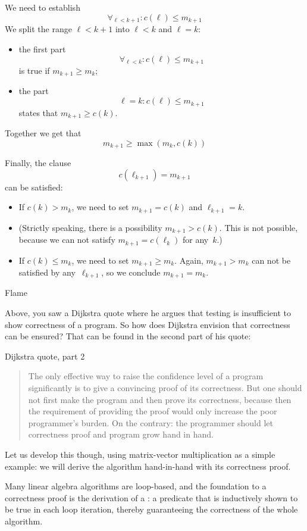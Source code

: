 We need to establish
\[ \forall_{\ell<k+1}\colon c(\ell)\leq m_{k+1} \]
We split the range $\ell<k+1$ into $\ell<k$ and $\ell=k$:
\begin{itemize}
\item the first part
  \[ \forall_{\ell<k}\colon c(\ell)\leq m_{k+1} \]
  is true if $m_{k+1}\geq m_k$;
\item the part
  \[ \ell=k \colon c(\ell)\leq m_{k+1} \]
  states that $m_{k+1}\geq c(k)$.
\end{itemize}
Together we get that
\[ m_{k+1}\geq \max(m_k,c(k)) \]

Finally, the clause \[ c(\ell_{k+1})=m_{k+1} \]
can be satisfied:
\begin{itemize}
\item If $c(k)>m_k$, we need to set $m_{k+1}=c(k)$ and $\ell_{k+1}=k$.
\item (Strictly speaking, there is a possibility 
  $m_{k+1}>c(k)$. This is not possible, because we
  can not satisfy $m_{k+1}=c(\ell_k)$ for any~$k$.)
\item If $c(k)\leq m_k$, we need to set $m_{k+1}\geq m_k$.
  Again, $m_{k+1}>m_k$ can not be satisfied by any~$\ell_{k+1}$,
  so we conclude $m_{k+1}=m_k$.
\end{itemize}

 {Flame}

Above, you saw a Dijkstra quote where he argues that testing is
insufficient to show correctness of a program.
So how does Dijkstra envision that correctness can be ensured?
That can be found in the second part of his quote:

\begin{block}{Dijkstra quote, part 2}
  \begin{quotation}
    The only effective way to raise the confidence level of a
    program significantly is to give a convincing proof of its
    correctness. But one should not first make the program and then
    prove its correctness, because then the requirement of providing
    the proof would only increase the poor programmer’s burden. On the
    contrary: the programmer should let correctness proof and program
    grow hand in hand.
  \end{quotation}
\end{block}

Let us develop this though, using matrix-vector multiplication
as a simple example:
we will derive the algorithm hand-in-hand with its correctness proof.

Many linear algebra algorithms are loop-based, and the foundation
to a correctness proof is the derivation of a :
a predicate that is inductively shown to be true in each loop iteration,
thereby guaranteeing the correctness of the whole algorithm.

